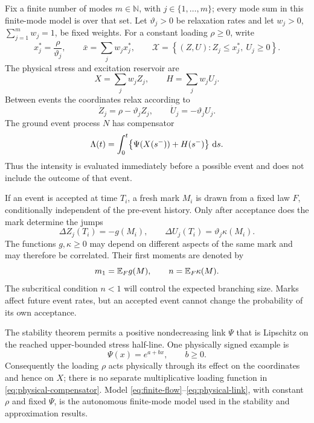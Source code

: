 Fix a finite number of modes \(m\in\mathbb N\), with \(j\in\{1,\ldots,m\}\); every mode sum in this finite-mode model is over that set. Let \(\vartheta_j>0\) be relaxation rates and let \(w_j>0\), \(\sum_{j=1}^m w_j=1\), be fixed weights. For a constant loading \(\rho\geq0\), write
\[
x_j^*=\frac{\rho}{\vartheta_j},\qquad
\bar x=\sum_jw_jx_j^*,\qquad
\mathcal X=\left\{(Z,U):Z_j\leq x_j^*,\ U_j\geq0\right\}.
\]
The physical stress and excitation reservoir are
\begin{equation}\label{eq:physical-XH}
X=\sum_jw_jZ_j,\qquad H=\sum_jw_jU_j.
\end{equation}
Between events the coordinates relax according to
\begin{equation}\label{eq:finite-flow}
\dot Z_j=\rho-\vartheta_jZ_j,\qquad
\dot U_j=-\vartheta_jU_j.
\end{equation}
The ground event process \(N\) has compensator
\begin{equation}\label{eq:physical-compensator}
\Lambda(t)=\int_0^t\bigl\{\Psi(X(s^-))+H(s^-)\bigr\}\,\mathop{}\!\mathrm{d} s .
\end{equation}
Thus the intensity is evaluated immediately before a possible event and does not include the outcome of that event.

If an event is accepted at time \(T_i\), a fresh mark \(M_i\) is drawn from a fixed law \(F\), conditionally independent of the pre-event history. Only after acceptance does the mark determine the jumps
\begin{equation}\label{eq:finite-jumps}
\Delta Z_j(T_i)=-g(M_i),\qquad
\Delta U_j(T_i)=\vartheta_j\kappa(M_i).
\end{equation}
The functions \(g,\kappa\geq0\) may depend on different aspects of the same mark and may therefore be correlated. Their first moments are denoted by
\[
m_1=\mathbb{E} _F g(M),\qquad n=\mathbb{E} _F\kappa(M).
\]
The subcritical condition \(n<1\) will control the expected branching size. Marks affect future event rates, but an accepted event cannot change the probability of its own acceptance.

The stability theorem permits a positive nondecreasing link $\Psi$ that is Lipschitz on the reached upper-bounded stress half-line. One physically signed example is
\begin{equation}\label{eq:physical-link}
\Psi(x)=e^{a+bx},\qquad b\geq0.
\end{equation}
Consequently the loading \(\rho\) acts physically through its effect on the coordinates and hence on \(X\); there is no separate multiplicative loading function in \eqref{eq:physical-compensator}. Model \eqref{eq:finite-flow}--\eqref{eq:physical-link}, with constant \(\rho\) and fixed \(\Psi\), is the autonomous finite-mode model used in the stability and approximation results.

